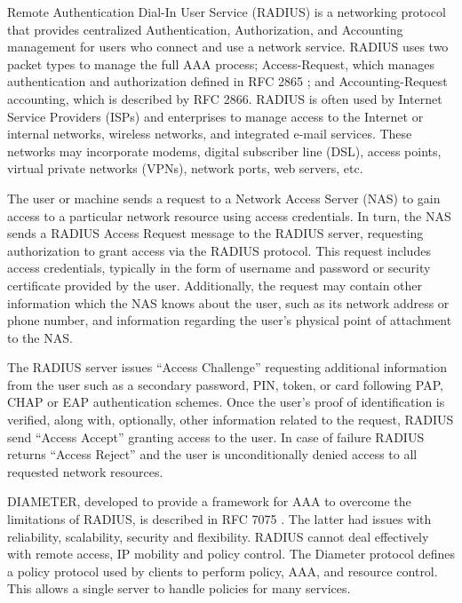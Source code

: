 \begin{multicols}{2}
Remote Authentication Dial-In User Service (RADIUS) is a networking protocol that provides centralized Authentication, Authorization, and Accounting management for users who connect and use a network service. RADIUS uses two packet types to manage the full AAA process; Access-Request, which manages authentication and authorization defined in RFC 2865 \cite{chap2-key8}; and Accounting-Request accounting, which is described by RFC 2866. RADIUS is often used by Internet Service Providers (ISPs) and enterprises to manage access to the Internet or internal networks, wireless networks, and integrated e-mail services. These networks may incorporate modems, digital subscriber line (DSL), access points, virtual private networks (VPNs), network ports, web servers, etc.

The user or machine sends a request to a Network Access Server (NAS) to gain access to a particular network resource using access credentials. In turn, the NAS sends a RADIUS Access Request message to the RADIUS server, requesting authorization to grant access via the RADIUS protocol. This request includes access credentials, typically in the form of username and password or security certificate provided by the user. Additionally, the request may contain other information which the NAS knows about the user, such as its network address or phone number, and information regarding the user's physical point of attachment to the NAS. 

The RADIUS server issues ``Access Challenge'' requesting additional information from the user such as a secondary password, PIN, token, or card following PAP, CHAP or EAP \cite{chap2-key9} authentication schemes. Once the user's proof of identification is verified, along with, optionally, other information related to the request, RADIUS send ``Access Accept'' granting access to the user. In case of failure RADIUS returns ``Access Reject'' and the user is unconditionally denied access to all requested network resources.

DIAMETER, developed to provide a framework for AAA to overcome the limitations of RADIUS, is described in RFC 7075 \cite{chap2-key24}. The latter had issues with reliability, scalability, security and flexibility. RADIUS cannot deal effectively with remote access, IP mobility and policy control. The Diameter protocol defines a policy protocol used by clients to perform policy, AAA, and resource control. This allows a single server to handle policies for many services.


\end{multicols}
